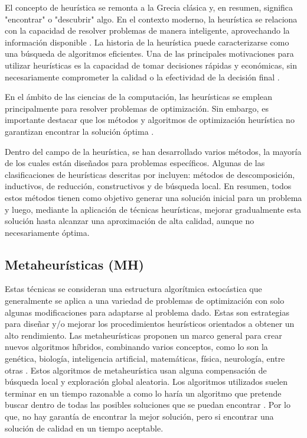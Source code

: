 El concepto de heurística se remonta a la Grecia clásica y, en resumen, significa "encontrar" o "descubrir" algo. En el contexto moderno, la heurística se relaciona con la capacidad de resolver problemas de manera inteligente, aprovechando la información disponible \cite{aprox-heuristica-metaheu}. La historia de la heurística puede caracterizarse como una búsqueda de algoritmos eficientes. Una de las principales motivaciones para utilizar heurísticas es la capacidad de tomar decisiones rápidas y económicas, sin necesariamente comprometer la calidad o la efectividad de la decisión final \cite{heu-tools-for-un-world}.

En el ámbito de las ciencias de la computación, las heurísticas se emplean principalmente para resolver problemas de optimización. Sin embargo, es importante destacar que los métodos y algoritmos de optimización heurística no garantizan encontrar la solución óptima \cite{10.5555/2020934}.

Dentro del campo de la heurística, se han desarrollado varios métodos, la mayoría de los cuales están diseñados para problemas específicos. Algunas de las clasificaciones de heurísticas descritas por \cite{aprox-heuristica-metaheu} incluyen: métodos de descomposición, inductivos, de reducción, constructivos y de búsqueda local. En resumen, todos estos métodos tienen como objetivo generar una solución inicial para un problema y luego, mediante la aplicación de técnicas heurísticas, mejorar gradualmente esta solución hasta alcanzar una aproximación de alta calidad, aunque no necesariamente óptima.

\vspace{2mm}


\subsection{Metaheurísticas (MH)}

\vspace{1mm}
\normalsize

Estas técnicas se consideran una estructura algorítmica estocástica que generalmente se aplica a una variedad de problemas de optimización con solo algunas modificaciones para adaptarse al problema dado. Estas son estrategias para diseñar y/o mejorar los procedimientos heurísticos orientados a obtener un alto rendimiento. Las metaheurísticas proponen un marco general para crear nuevos algoritmos híbridos, combinando varios conceptos, como lo son la genética, biología, inteligencia artificial, matemáticas, física, neurología, entre otras \cite{aprox-heuristica-metaheu}. Estos algoritmos de metaheurística usan alguna compensación de búsqueda local y exploración global aleatoria. Los algoritmos utilizados suelen terminar en un tiempo razonable a como lo haría un algoritmo que pretende buscar dentro de todas las posibles soluciones que se puedan encontrar \cite{metaheu-algo-modeling-optimization}. Por lo que, no hay garantía de encontrar la mejor solución, pero si encontrar una solución de calidad en un tiempo aceptable.

